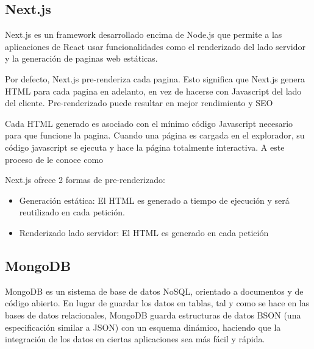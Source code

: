     \subsection{Next.js}

        Next.js es un framework desarrollado encima de Node.js que permite a las aplicaciones de React usar funcionalidades como el renderizado del lado servidor y la generación de paginas web estáticas.

        Por defecto, Next.js pre-renderiza cada pagina. Esto significa que Next.js genera HTML para cada pagina en adelanto, en vez de hacerse con Javascript del lado del cliente. Pre-renderizado puede resultar en mejor rendimiento y SEO

        Cada HTML generado es asociado con el mínimo código Javascript necesario para que funcione la pagina. Cuando una página es cargada en el explorador, su código javascript se ejecuta y hace la página totalmente interactiva. A este proceso de le conoce como 

        Next.js ofrece 2 formas de pre-renderizado: 

        \begin{itemize}
            \item Generación estática: El HTML es generado a tiempo de ejecución y será reutilizado en cada petición.
            \item Renderizado lado servidor: El HTML es generado en cada petición
        \end{itemize}

    \subsection{MongoDB}

        MongoDB es un sistema de base de datos NoSQL, orientado a documentos y de código abierto. En lugar de guardar los datos en tablas, tal y como se hace en las bases de datos relacionales, MongoDB guarda estructuras de datos BSON (una especificación similar a JSON) con un esquema dinámico, haciendo que la integración de los datos en ciertas aplicaciones sea más fácil y rápida.

        \iffalse 
            \begin{figure}
                \texttt{[image: mongodb-structure.jpg]}
                \caption{Comparación de estructura de datos entre MongoDB y los RDBMS (sistema de gestión de bases de datos relacionales)}
            \end{figure}
        \fi

